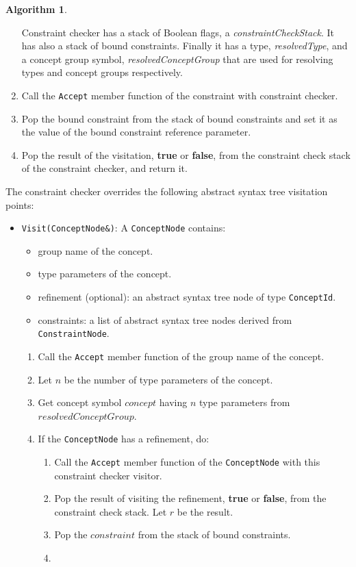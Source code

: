 \documentclass[a4paper,oneside,11pt]{book}
\theoremstyle{definition}
\newtheorem{algo}{Algorithm}[section]
\begin{document}
\begin{algo}
\begin{enumerate}
Constraint checker has a stack of Boolean flags, a \emph{constraintCheckStack}.
It has also a stack of bound constraints.
Finally it has a type, \emph{resolvedType}, and a concept group symbol, \emph{resolvedConceptGroup}
that are used for resolving types and concept groups respectively.
\item
Call the \verb|Accept| member function of the constraint with constraint checker.
\item
Pop the bound constraint from the stack of bound constraints and set it as the value of the bound constraint reference parameter.
\item
Pop the result of the visitation, \textbf{true} or \textbf{false}, from the constraint check stack of the constraint checker, and return it.
\end{enumerate}
The constraint checker overrides the following abstract syntax tree visitation points:
\begin{itemize}
\item
\verb|Visit(ConceptNode&)|:
A \verb|ConceptNode| contains:
\begin{itemize}
\item
group name of the concept.
\item
type parameters of the concept.
\item
refinement (optional): an abstract syntax tree node of type \verb|ConceptId|.
\item
constraints: a list of abstract syntax tree nodes derived from \verb|ConstraintNode|.
\end{itemize}
\begin{enumerate}
\item
Call the \verb|Accept| member function of the group name of the concept.
\item
Let $n$ be the number of type parameters of the concept.
\item
Get concept symbol $concept$ having $n$ type parameters from $resolvedConceptGroup$.
\item
If the \verb|ConceptNode| has a refinement, do:
\begin{enumerate}
\item
Call the \verb|Accept| member function of the \verb|ConceptNode| with this constraint checker visitor.
\item
Pop the result of visiting the refinement, \textbf{true} or \textbf{false}, from the constraint check stack. Let $r$ be the result.
\item
Pop the $constraint$ from the stack of bound constraints.
\item

\end{enumerate}
\end{enumerate}
\end{itemize}
\end{algo}
\end{document}

